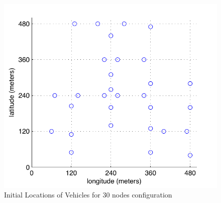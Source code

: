 \documentclass[twocolumn]{article}
\begin{document}
    \begin{figure}[htb]
    \begin{center}
    \includegraphics[width=\columnwidth]{fig/locations.pdf}
    \caption{Initial Locations of Vehicles for 30 nodes configuration}
    \label{fig:locations}
    \end{center}
    \end{figure}
\end{document}
